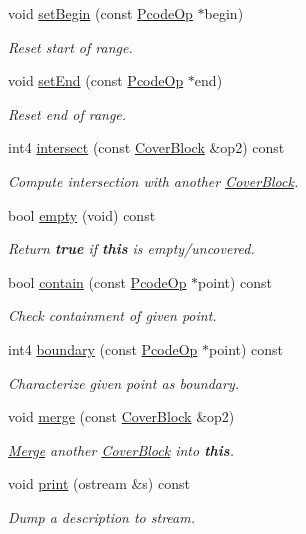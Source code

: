 \begin{DoxyCompactItemize}
void \mbox{\hyperlink{class_cover_block_a9c1ef0ab93cc4107a954cd4842ca1d27}{set\+Begin}} (const \mbox{\hyperlink{class_pcode_op}{Pcode\+Op}} $\ast$begin)
\begin{DoxyCompactList}\small\item\em Reset start of range. \end{DoxyCompactList}\item 
void \mbox{\hyperlink{class_cover_block_aa6171bf30cc73dcf75bafdbe71b83a5d}{set\+End}} (const \mbox{\hyperlink{class_pcode_op}{Pcode\+Op}} $\ast$end)
\begin{DoxyCompactList}\small\item\em Reset end of range. \end{DoxyCompactList}\item 
int4 \mbox{\hyperlink{class_cover_block_a26da4f088471ccf7e896fa2e7f657444}{intersect}} (const \mbox{\hyperlink{class_cover_block}{Cover\+Block}} \&op2) const
\begin{DoxyCompactList}\small\item\em Compute intersection with another \mbox{\hyperlink{class_cover_block}{Cover\+Block}}. \end{DoxyCompactList}\item 
bool \mbox{\hyperlink{class_cover_block_a2de972d5c460a06fe8340a454423f509}{empty}} (void) const
\begin{DoxyCompactList}\small\item\em Return {\bfseries{true}} if {\bfseries{this}} is empty/uncovered. \end{DoxyCompactList}\item 
bool \mbox{\hyperlink{class_cover_block_abdea54abaa486a9cdfc03e083aaabb65}{contain}} (const \mbox{\hyperlink{class_pcode_op}{Pcode\+Op}} $\ast$point) const
\begin{DoxyCompactList}\small\item\em Check containment of given point. \end{DoxyCompactList}\item 
int4 \mbox{\hyperlink{class_cover_block_ad8f60860ed4169e0f574d4e1ebc1b779}{boundary}} (const \mbox{\hyperlink{class_pcode_op}{Pcode\+Op}} $\ast$point) const
\begin{DoxyCompactList}\small\item\em Characterize given point as boundary. \end{DoxyCompactList}\item 
void \mbox{\hyperlink{class_cover_block_ad686102d99fec796c67db2778d9981e5}{merge}} (const \mbox{\hyperlink{class_cover_block}{Cover\+Block}} \&op2)
\begin{DoxyCompactList}\small\item\em \mbox{\hyperlink{class_merge}{Merge}} another \mbox{\hyperlink{class_cover_block}{Cover\+Block}} into {\bfseries{this}}. \end{DoxyCompactList}\item 
void \mbox{\hyperlink{class_cover_block_a58f570ab514cdabc3b9671cdb08911e7}{print}} (ostream \&s) const
\begin{DoxyCompactList}\small\item\em Dump a description to stream. \end{DoxyCompactList}\end{DoxyCompactItemize}
